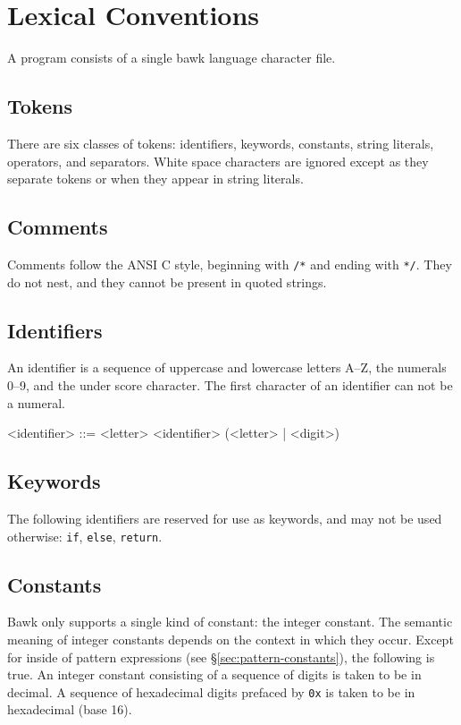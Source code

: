 \section{Lexical Conventions}
A program consists of a single bawk language character file.

\subsection{Tokens}
There are six classes of tokens: identifiers, keywords, constants, string literals, operators, and separators.  White space characters are ignored except as they separate tokens or when they appear in string literals.

\subsection{Comments}
Comments follow the ANSI C style, beginning with \texttt{/*} and ending with \texttt{*/}.  They do not nest, and they cannot be present in quoted strings.

\subsection{Identifiers}
\label{sec:identifiers}
An identifier is a sequence of uppercase and lowercase letters A--Z, the numerals 0--9, and the under score character.  The first character of an identifier can not be a numeral.

\begin{grammar}
<identifier> ::= <letter>
\alt <identifier> (<letter> | <digit>)
\end{grammar}

\subsection{Keywords}
The following identifiers are reserved for use as keywords, and may not be used otherwise: \texttt{if}, \texttt{else}, \texttt{return}.

\subsection{Constants}
\label{sec:constants}
Bawk only supports a single kind of constant: the integer constant.  The semantic meaning of integer constants depends on the context in which they occur.  Except for inside of pattern expressions (see \S\ref{sec:pattern-constants}), the following is true.  An integer constant consisting of a sequence of digits is taken to be in decimal.  A sequence of hexadecimal digits prefaced by \texttt{0x} is taken to be in hexadecimal (base 16).

